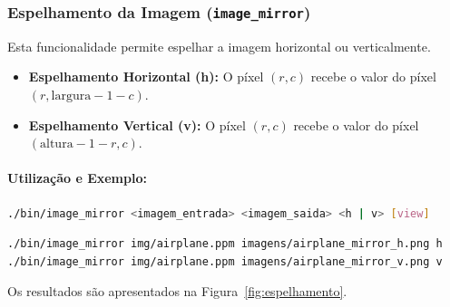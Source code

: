 \documentclass[a4paper, 11pt, portuguese]{article}
\begin{document}
\subsubsection{Espelhamento da Imagem (\texttt{image\_mirror})}
Esta funcionalidade permite espelhar a imagem horizontal ou verticalmente.
\begin{itemize}
    \item \textbf{Espelhamento Horizontal (h):} O píxel $(r, c)$ recebe o valor do píxel $(r, \text{largura} - 1 - c)$.
    \item \textbf{Espelhamento Vertical (v):} O píxel $(r, c)$ recebe o valor do píxel $(\text{altura} - 1 - r, c)$.
\end{itemize}

\paragraph{Utilização e Exemplo:}
\begin{lstlisting}[language=bash, caption=Sintaxe de Uso do image\_mirror]
./bin/image_mirror <imagem_entrada> <imagem_saida> <h | v> [view]
\end{lstlisting}
\begin{lstlisting}[language=bash]
./bin/image_mirror img/airplane.ppm imagens/airplane_mirror_h.png h
./bin/image_mirror img/airplane.ppm imagens/airplane_mirror_v.png v
\end{lstlisting}
Os resultados são apresentados na Figura~\ref{fig:espelhamento}.
\end{document}

